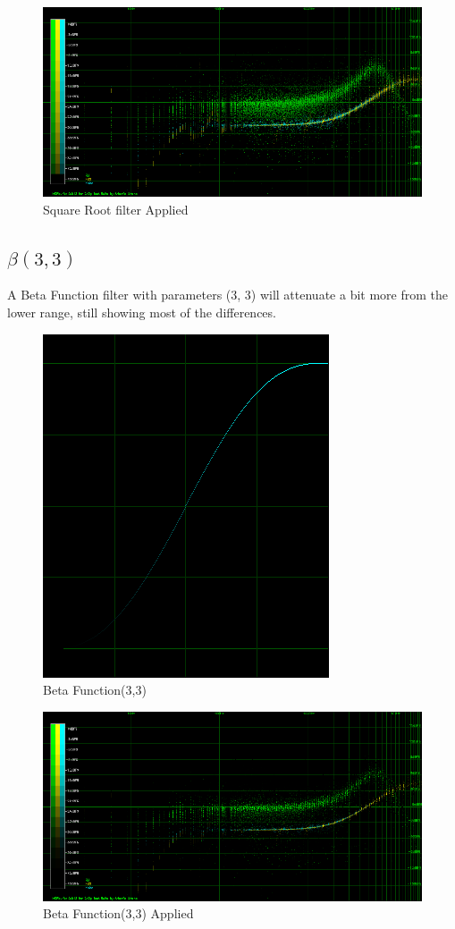 \documentclass[10pt,a4paper]{report}
\begin{document}
\begin{figure}[H]
	\centering
	\includegraphics[width=1\linewidth]{plots/BetaFunctionPlot_1_Data}
	\caption[Square Root filter]{Square Root filter Applied}
	\label{fig:betafunctionplot1data}
\end{figure}

\newpage
\subsection{$\beta(3,3)$}

A Beta Function filter with parameters (3, 3) will attenuate a bit more from the lower range, still showing most of the differences.

\begin{figure}[H]
	\centering
	\includegraphics[width=0.4\linewidth]{plots/BetaFunctionPlot_2}
	\caption[Beta Function(3,3)]{Beta Function(3,3)}
	\label{fig:betafunctionplot2}
\end{figure}

\begin{figure}[H]
	\centering
	\includegraphics[width=1\linewidth]{plots/BetaFunctionPlot_2_Data}
	\caption[Beta Function(3,3)]{Beta Function(3,3) Applied}
	\label{fig:betafunctionplot2data}
\end{figure}
\end{document}
